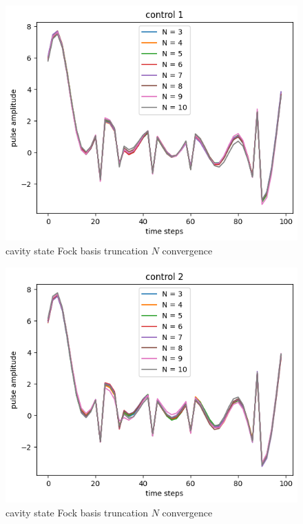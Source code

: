 \documentclass{article}
\begin{document}
\begin{figure}[H]
    \centering
    \includegraphics[width=0.6\linewidth]{check_convergence_control1.png}
    \caption{cavity state Fock basis truncation $N$ convergence}
    \label{fig:check_convergence_control1}
\end{figure}

\begin{figure}[H]
    \centering
    \includegraphics[width=0.6\linewidth]{check_convergence_control2.png}
    \caption{cavity state Fock basis truncation $N$ convergence}
    \label{fig:check_convergence_control2}
\end{figure}

\end{document}
